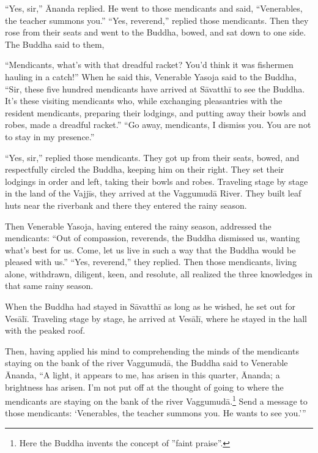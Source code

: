 \documentclass[12pt,openany]{book}%
\begin{document}
“Yes, sir,” Ānanda replied. He went to those mendicants and said, “Venerables, the teacher summons you.” “Yes, reverend,” replied those mendicants. Then they rose from their seats and went to the Buddha, bowed, and sat down to one side. The Buddha said to them, 

“Mendicants, what’s with that dreadful racket? You’d think it was fishermen hauling in a catch!” When he said this, Venerable Yasoja said to the Buddha, “Sir, these five hundred mendicants have arrived at \textsanskrit{Sāvatthī} to see the Buddha. It’s these visiting mendicants who, while exchanging pleasantries with the resident mendicants, preparing their lodgings, and putting away their bowls and robes, made a dreadful racket.” “Go away, mendicants, I dismiss you. You are not to stay in my presence.” 

“Yes, sir,” replied those mendicants. They got up from their seats, bowed, and respectfully circled the Buddha, keeping him on their right. They set their lodgings in order and left, taking their bowls and robes. Traveling stage by stage in the land of the \textsanskrit{Vajjīs}, they arrived at the \textsanskrit{Vaggumudā} River. They built leaf huts near the riverbank and there they entered the rainy season. 

Then Venerable Yasoja, having entered the rainy season, addressed the mendicants: “Out of compassion, reverends, the Buddha dismissed us, wanting what’s best for us. Come, let us live in such a way that the Buddha would be pleased with us.” “Yes, reverend,” they replied. Then those mendicants, living alone, withdrawn, diligent, keen, and resolute, all realized the three knowledges in that same rainy season. 

When the Buddha had stayed in \textsanskrit{Sāvatthī} as long as he wished, he set out for \textsanskrit{Vesālī}. Traveling stage by stage, he arrived at \textsanskrit{Vesālī}, where he stayed in the hall with the peaked roof. 

Then, having applied his mind to comprehending the minds of the mendicants staying on the bank of the river \textsanskrit{Vaggumudā}, the Buddha said to Venerable Ānanda, “A light, it appears to me, has arisen in this quarter, Ānanda; a brightness has arisen. I’m not put off at the thought of going to where the mendicants are staying on the bank of the river \textsanskrit{Vaggumudā}.\footnote{Here the Buddha invents the concept of ”faint praise”. } Send a message to those mendicants: ‘Venerables, the teacher summons you. He wants to see you.’” 
\end{document}
